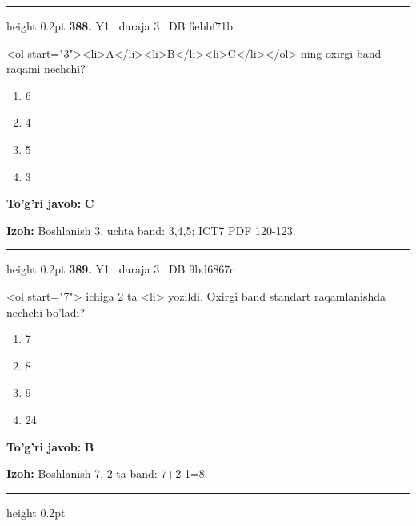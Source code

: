 \documentclass[10pt,a4paper,oneside]{article}
\begin{document}
\vspace{2mm}\hrule height 0.2pt \vspace{4mm}
\hypertarget{q388}{\textbf{\color{ink}388.}}  {\color{muted}\scriptsize Y1 \textbullet\ daraja 3 \textbullet\ DB 6ebbf71b}
\par
\textless{}ol start="3"\textgreater{}\textless{}li\textgreater{}A\textless{}/li\textgreater{}\textless{}li\textgreater{}B\textless{}/li\textgreater{}\textless{}li\textgreater{}C\textless{}/li\textgreater{}\textless{}/ol\textgreater{} ning oxirgi band raqami nechchi?
\begin{enumerate}[label=\Alph*),leftmargin=9mm]
\item 6
\item 4
\item 5
\item 3
\end{enumerate}
\begin{tcolorbox}[enhanced,breakable,colback=teal!4,colframe=teal!45!black,boxrule=0.45pt,arc=1.2mm,left=2.8mm,right=2.8mm,top=2mm,bottom=2mm,before skip=2mm,after skip=2mm]
\textbf{\color{teal}To'g'ri javob:} \textbf{C}
\par\smallskip
\textbf{Izoh:} Boshlanish 3, uchta band: 3,4,5; ICT7 PDF 120-123.
\end{tcolorbox}
\vspace{2mm}\hrule height 0.2pt \vspace{4mm}
\hypertarget{q389}{\textbf{\color{ink}389.}}  {\color{muted}\scriptsize Y1 \textbullet\ daraja 3 \textbullet\ DB 9bd6867c}
\par
\textless{}ol start="7"\textgreater{} ichiga 2 ta \textless{}li\textgreater{} yozildi. Oxirgi band standart raqamlanishda nechchi bo'ladi?
\begin{enumerate}[label=\Alph*),leftmargin=9mm]
\item 7
\item 8
\item 9
\item 24
\end{enumerate}
\begin{tcolorbox}[enhanced,breakable,colback=teal!4,colframe=teal!45!black,boxrule=0.45pt,arc=1.2mm,left=2.8mm,right=2.8mm,top=2mm,bottom=2mm,before skip=2mm,after skip=2mm]
\textbf{\color{teal}To'g'ri javob:} \textbf{B}
\par\smallskip
\textbf{Izoh:} Boshlanish 7, 2 ta band: 7+2-1=8.
\end{tcolorbox}
\vspace{2mm}\hrule height 0.2pt \vspace{4mm}
\end{document}
